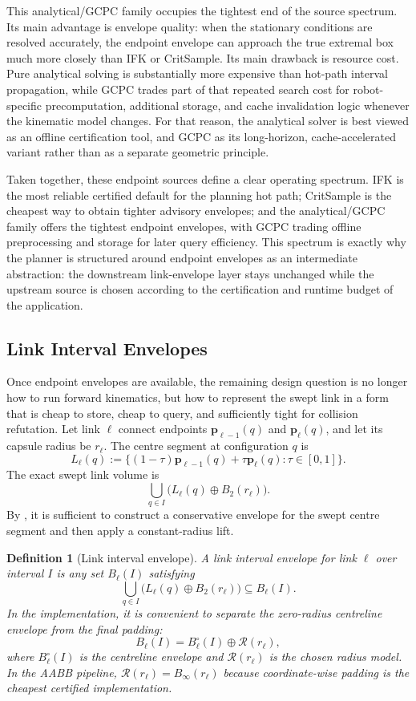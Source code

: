 \documentclass[journal]{IEEEtran}
\newtheorem{definition}{Definition}
\begin{document}
This analytical/GCPC family occupies the tightest end of the source spectrum.
Its main advantage is envelope quality: when the stationary conditions are
resolved accurately, the endpoint envelope can approach the true extremal box
much more closely than IFK or CritSample. Its main drawback is resource cost.
Pure analytical solving is substantially more expensive than hot-path interval
propagation, while GCPC trades part of that repeated search cost for
robot-specific precomputation, additional storage, and cache invalidation logic
whenever the kinematic model changes. For that reason, the analytical solver is
best viewed as an offline certification tool, and GCPC as its long-horizon,
cache-accelerated variant rather than as a separate geometric principle.

Taken together, these endpoint sources define a clear operating spectrum. IFK
is the most reliable certified default for the planning hot path; CritSample is
the cheapest way to obtain tighter advisory envelopes; and the
analytical/GCPC family offers the tightest endpoint envelopes, with GCPC
trading offline preprocessing and storage for later query efficiency. This
spectrum is exactly why the planner is
structured around endpoint envelopes as an intermediate abstraction: the
downstream link-envelope layer stays unchanged while the upstream source is
chosen according to the certification and runtime budget of the application.

\subsection{Link Interval Envelopes}\label{sec:rewrite_link_env}

Once endpoint envelopes are available, the remaining design question is no
longer how to run forward kinematics, but how to represent the swept link in a
form that is cheap to store, cheap to query, and sufficiently tight for
collision refutation. Let link $\ell$ connect endpoints
$\bm{p}_{\ell-1}(q)$ and $\bm{p}_{\ell}(q)$, and let its capsule radius be
$r_\ell$. The centre segment at configuration $q$ is
\[
L_\ell(q) := \{(1-\tau)\bm{p}_{\ell-1}(q) + \tau \bm{p}_{\ell}(q) :
\tau \in [0,1]\}.
\]
The exact swept link volume is
\[
\bigcup_{q\in I} \bigl(L_\ell(q) \oplus B_2(r_\ell)\bigr).
\]
By , it is sufficient to construct a conservative
envelope for the swept centre segment and then apply a constant-radius lift.

\begin{definition}[Link interval envelope]\label{def:link_interval_env}
A link interval envelope for link $\ell$ over interval $I$ is any set
$B_\ell(I)$ satisfying
\[
\bigcup_{q\in I} \bigl(L_\ell(q) \oplus B_2(r_\ell)\bigr) \subseteq B_\ell(I).
\]
In the implementation, it is convenient to separate the zero-radius centreline
envelope from the final padding:
\[
B_\ell(I) = B_\ell^{\circ}(I) \oplus \mathcal{R}(r_\ell),
\]
where $B_\ell^{\circ}(I)$ is the centreline envelope and
$\mathcal{R}(r_\ell)$ is the chosen radius model. In the AABB pipeline,
$\mathcal{R}(r_\ell)=B_\infty(r_\ell)$ because coordinate-wise padding is the
cheapest certified implementation.
\end{definition}
\end{document}
